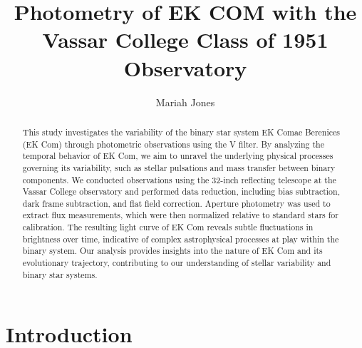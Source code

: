 \documentclass[]{aastex63}
\begin{document}
\title{Photometry of EK COM with the Vassar College Class of 1951 Observatory}

\author{Mariah Jones}

\begin{abstract}
This study investigates the variability of the binary star system EK Comae Berenices (EK Com) through photometric observations using the V filter. By analyzing the temporal behavior of EK Com, we aim to unravel the underlying physical processes governing its variability, such as stellar pulsations and mass transfer between binary components. We conducted observations using the 32-inch reflecting telescope at the Vassar College observatory and performed data reduction, including bias subtraction, dark frame subtraction, and flat field correction. Aperture photometry was used to extract flux measurements, which were then normalized relative to standard stars for calibration. The resulting light curve of EK Com reveals subtle fluctuations in brightness over time, indicative of complex astrophysical processes at play within the binary system. Our analysis provides insights into the nature of EK Com and its evolutionary trajectory, contributing to our understanding of stellar variability and binary star systems.

\end{abstract}

\section{Introduction}
\end{document}
